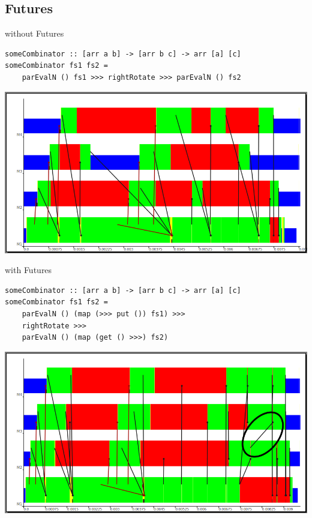 \subsection{Futures}
\begin{frame}[fragile]{without Futures}
\begin{lstlisting}[frame=htrbl]
someCombinator :: [arr a b] -> [arr b c] -> arr [a] [c]
someCombinator fs1 fs2 =
	parEvalN () fs1 >>>	rightRotate >>>	parEvalN () fs2
\end{lstlisting}
\begin{center}
\includegraphics[scale=0.3]{images/withoutFutures}
\end{center}
\end{frame}
\begin{frame}[fragile]{with Futures}
\begin{lstlisting}[frame=htrbl]
someCombinator :: [arr a b] -> [arr b c] -> arr [a] [c]
someCombinator fs1 fs2 =
	parEvalN () (map (>>> put ()) fs1) >>>
	rightRotate >>>
	parEvalN () (map (get () >>>) fs2)
\end{lstlisting}
\begin{center}
\includegraphics[scale=0.35]{images/withFutures}
\end{center}
\end{frame}